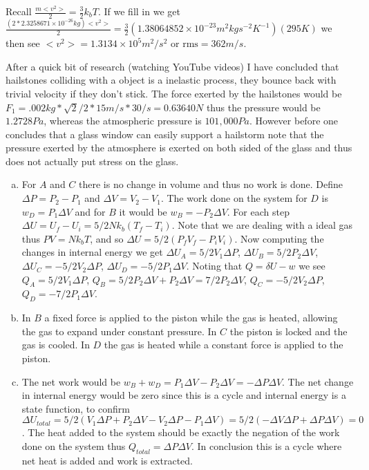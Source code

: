 \documentclass[12pt]{article}
\makeatletter
\theoremstyle{homework}
\newenvironment{exercise}[1]
{\def\@currentlabel{#1}\exercisecore}
{\endexercisecore}
\makeatother
\begin{document}
\begin{exercise}{1.18}
Recall $\frac{m<v^2>}{2}=\frac{3}{2}k_bT$.  If we fill in we get $\frac{(2*2.3258671 \times 10^{-26} kg)<v^2>}{2}=\frac{3}{2}(1.38064852 \times 10^{-23} m^2 kg s^{-2} K^{-1})(295K)$ we then see $<v^2>=1.3134\times 10^5 m^2/s^2$ or $\text{rms}=362m/s$.
\end{exercise}

\begin{exercise}{1.21}
After a quick bit of research (watching YouTube videos) I have concluded that hailstones colliding with a object is a inelastic process, they bounce back with trivial velocity if they don't stick.  The force exerted by the hailstones would be $F_1=.002kg*\sqrt{2}/2*15m/s*30/s=0.63640N$ thus the pressure would be $1.2728Pa$, whereas the atmospheric pressure is $101,000Pa$.  However before one concludes that a glass window can easily support a hailstorm note that the pressure exerted by the atmosphere is exerted on both sided of the glass and thus does not actually put stress on the glass.
\end{exercise}

\begin{exercise}{1.34}
\begin{enumerate}[(a)]
\item
For $A$ and $C$ there is no change in volume and thus no work is done.  Define $\Delta P=P_2-P_1$ and $\Delta V=V_2-V_1$.  The work done on the system for $D$ is $w_D=P_1 \Delta V$ and for $B$ it would be $w_B=-P_2 \Delta V$.  For each step $\Delta U=U_f-U_i=5/2 N k_b (T_f-T_i)$.  Note that we are dealing with a ideal gas thus $PV=Nk_bT$, and so $\Delta U=5/2(P_fV_f-P_iV_i)$.  Now computing the changes in internal energy we get $\Delta U_A=5/2V_1\Delta P$, $\Delta U_B=5/2P_2\Delta V$, $\Delta U_C=-5/2V_2\Delta P$, $\Delta U_D=-5/2P_1\Delta V$.  Noting that $Q=\delta U-w$ we see $Q_A=5/2V_1\Delta P$, $Q_B=5/2P_2\Delta V+P_2 \Delta V=7/2P_2\Delta V$, $Q_C=-5/2V_2\Delta P$, $Q_D=-7/2P_1\Delta V$.
\item
In $B$ a fixed force is applied to the piston while the gas is heated, allowing the gas to expand under constant pressure.  In $C$ the piston is locked and the gas is cooled. In $D$ the gas is heated while a constant force is applied to the piston.
\item
The net work would be $w_B+w_D=P_1 \Delta V-P_2 \Delta V=-\Delta P \Delta V$.  The net change in internal energy would be zero since this is a cycle and internal energy is a state function, to confirm $\Delta U_{total}=5/2(V_1\Delta P+P_2\Delta V-V_2\Delta P-P_1\Delta V)=5/2(-\Delta V\Delta P+\Delta P\Delta V)=0$.  The heat added to the system should be exactly the negation of the work done on the system thus $Q_{total}=\Delta P \Delta V$.  In conclusion this is a cycle where net heat is added and work is extracted.
\end{enumerate}
\end{exercise}
\end{document}
